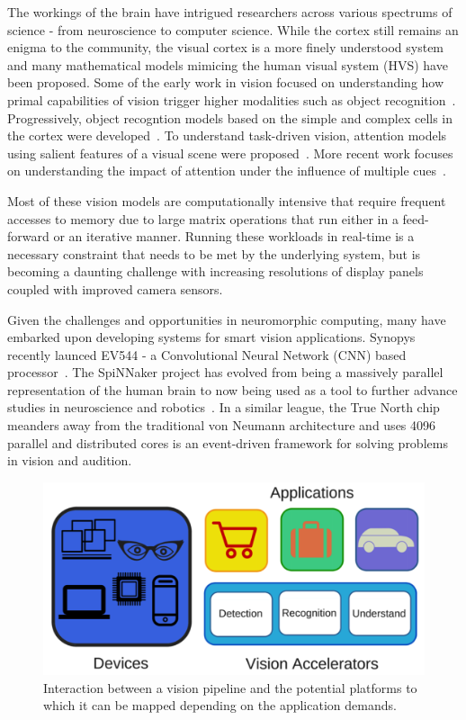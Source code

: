 The workings of the brain have intrigued researchers across various spectrums of science - from neuroscience to computer science. While the cortex still remains 
an enigma to the community, the visual cortex is a more finely understood system and many mathematical models mimicing the 
human visual system (HVS) have been proposed. Some of the early work in vision focused on understanding how primal capabilities of vision trigger higher modalities 
such as object recognition~\cite{marr}. Progressively, object recogntion models based on the simple and complex cells in the cortex were developed~\cite{Mutch2008}. 
To understand task-driven vision, attention models using salient features of 
a visual scene were proposed~\cite{Bruce2006, Itti2001}. More recent work focuses on understanding the impact of attention under the influence of multiple cues~\cite{wyble2014}.

Most of these vision models are computationally intensive that require frequent accesses to memory due to large matrix operations 
that run either in a feed-forward or an iterative manner. 
Running these workloads in real-time is a necessary constraint that needs 
to be met by the underlying system, but is becoming a daunting challenge with increasing resolutions of 
display panels coupled with improved camera sensors.

Given the challenges and opportunities in neuromorphic computing, many have embarked upon developing systems for smart vision applications. 
Synopys recently launced EV544 - a Convolutional Neural Network (CNN) based processor~\cite{syncnn}.
The SpiNNaker project has evolved from being a massively parallel representation of the human brain to now being used as a tool to further advance studies in 
neuroscience and robotics~\cite{spinnaker}. In a similar league, the True North chip~\cite{truenorth} meanders away from the traditional 
von Neumann architecture and uses 4096 parallel and distributed cores is an event-driven framework for solving problems in vision and audition.

\begin{figure}[!htb]
\vspace{0pt}
\centering
\includegraphics[width=0.9\linewidth]{./figures/vision_apps_devices.png}
\vspace{0pt}
\caption{Interaction between a vision pipeline and the potential platforms to which it can be mapped depending on the application demands.}
\label{fig:iot}
\vspace{0pt}
\end{figure}

